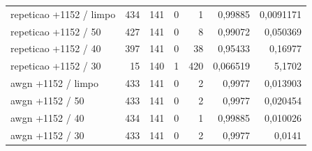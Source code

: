 \begin{longtable}{@{}p{.38\linewidth}rrrrrr@{}}
repeticao +1152 /\allowbreak{} limpo & 434 & 141 & 0 & 1 & 0,99885 & 0,0091171\\
repeticao +1152 /\allowbreak{} 50 & 427 & 141 & 0 & 8 & 0,99072 & 0,050369\\
repeticao +1152 /\allowbreak{} 40 & 397 & 141 & 0 & 38 & 0,95433 & 0,16977\\
repeticao +1152 /\allowbreak{} 30 & 15 & 140 & 1 & 420 & 0,066519 & 5,1702\\
awgn +1152 /\allowbreak{} limpo & 433 & 141 & 0 & 2 & 0,9977 & 0,013903\\
awgn +1152 /\allowbreak{} 50 & 433 & 141 & 0 & 2 & 0,9977 & 0,020454\\
awgn +1152 /\allowbreak{} 40 & 434 & 141 & 0 & 1 & 0,99885 & 0,010026\\
awgn +1152 /\allowbreak{} 30 & 433 & 141 & 0 & 2 & 0,9977 & 0,0141\\
\bottomrule\end{longtable}\normalsize


